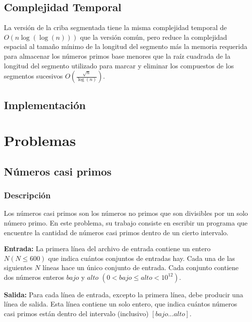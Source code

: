 \documentclass[12pt]{article}
\newcommand{\nl}{\vspace{0.3cm}}
\begin{document}
\subsection{Complejidad Temporal}

\nl

La versión de la criba segmentada tiene la misma complejidad temporal de $O(n \log(\log(n)))$ que la versión común, pero reduce la complejidad espacial al tamaño mínimo de la longitud del segmento más la memoria requerida para almacenar los números primos base menores que la raíz cuadrada de la longitud del segmento utilizado para marcar y eliminar los compuestos de los segmentos sucesivos $O\left(\frac{\sqrt{n}}{\log(n)}\right)$.

\subsection{Implementación}



\section{Problemas}

\subsection{Números casi primos}

\nl

\subsubsection{Descripción}

Los números casi primos son los números no primos que son divisibles por un solo número primo. En este problema, su trabajo consiste en escribir un programa que encuentre la cantidad de números casi primos dentro de un cierto intervalo.

\nl

\textbf{Entrada:} La primera línea del archivo de entrada contiene un entero $N (N \leqslant 600)$ que indica cuántos conjuntos de entradas hay. Cada una de las siguientes $N$ líneas hace un único conjunto de entrada. Cada conjunto contiene dos números enteros $bajo$ y $alto$ $(0 < bajo \leqslant alto < 10^{12})$.

\nl

\textbf{Salida:} Para cada línea de entrada, excepto la primera línea, debe producir una línea de salida. Esta línea contiene un solo entero, que indica cuántos números casi primos están dentro del intervalo (inclusivo) $[bajo ... alto]$.
\end{document}
